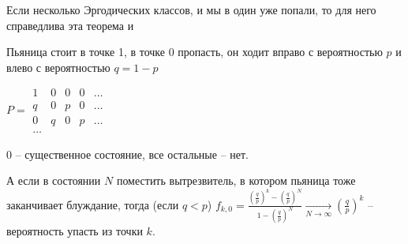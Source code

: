 Если несколько Эргодических классов, и мы в один уже попали, то для него справедлива эта теорема и \TODO


\begin{exmp}

Пьяница стоит в точке 1, в точке 0 пропасть, он ходит вправо с вероятностью $p$ и влево с вероятностью $q = 1 - p$

$P = \begin{matrix} 
1 & 0 & 0 & 0 & \dots \\
q & 0 & p & 0 & \dots \\
0 & q & 0 & p & \dots \\
\dots
\end{matrix}
$

0 -- существенное состояние, все остальные -- нет.

А если в состоянии $N$ поместить вытрезвитель, в котором пьяница тоже заканчивает блуждание, тогда (если $q < p$)
$f_{k,0} = \frac{(\frac{q}{p})^k - (\frac{q}{p})^N}{1 - (\frac{q}{p})^N} \xrightarrow[N \to \infty]{} (\frac{q}{p})^k$ -- вероятность упасть из точки $k$.
\end{exmp}
